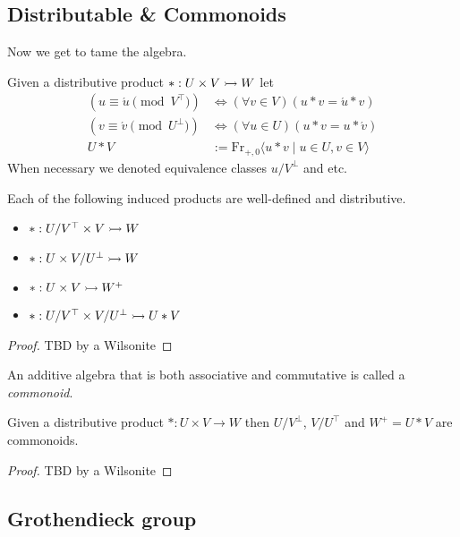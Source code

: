 \subsection{Distributable \& Commonoids}

Now we get to tame the algebra.  
\begin{definition}
    Given a distributive product $*:U\times V\rightarrowtail W$
    let 
    \begin{align*}
        (u\equiv \acute{u} \pmod{V^{\top}}) & \Leftrightarrow (\forall v\in V)(u*v=\acute{u}*v)\\
        (v\equiv \acute{v} \pmod{U^{\bot}}) & \Leftrightarrow (\forall u\in U)(u*v=u*\acute{v})\\
        U*V & := \text{Fr}_{+,0}\langle u*v \mid u\in U, v\in V\rangle
    \end{align*}
    When necessary we denoted equivalence classes $u/{V^{\bot}}$ and etc.
\end{definition}

\begin{proposition}
    Each of the following induced products are well-defined and distributive.
    \begin{itemize}
        \item $*:U/V^{\top} \times V\rightarrowtail W$
        \item $*:U \times V/U^{\bot}\rightarrowtail W$
        \item $*:U \times V\rightarrowtail W^+$
        \item $*:U/V^{\top} \times V/U^{\bot}\rightarrowtail U*V$
    \end{itemize}
\end{proposition}
\begin{proof}
    TBD by a Wilsonite
\end{proof}

\begin{definition}
    An additive algebra that is both associative and commutative is called a \emph{commonoid}.
\end{definition}

\begin{proposition}
    Given a distributive product $*:U\times V\to W$ then 
    $U/V^{\bot}$, $V/U^{\top}$ and $W^+=U*V$ are commonoids.
\end{proposition}
\begin{proof}
    TBD by a Wilsonite
\end{proof}

\subsection{Grothendieck group}

